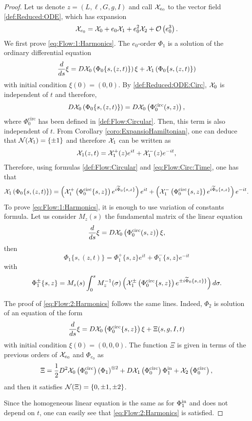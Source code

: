 \begin{proof}
Let us denote $z=(L,\ell,G,g,I)$ and call $\mathcal{X}_{e_0}$ to the vector field \eqref{def:Reduced:ODE}, which has expansion
\[
\mathcal{X}_{e_0}=\mathcal{X}_{0}+e_0\mathcal{X}_{1}+e_0^2\mathcal{X}_{2}+\mathcal{O}\left(e_0^3\right).
\]
We first prove \eqref{eq:Flow:1:Harmonics}.  The $e_0$-order $\Phi_1$ is a solution of the ordinary differential equation
  \[
  \frac{d}{ds} \xi=D\mathcal{X}_0\left(\Phi_0\{s,(z,t)\}\right)\xi+\mathcal{X}_1\left(\Phi_0\{s,(z,t)\}\right)
  \]
  with initial condition $\xi(0)=(0,0)$. By \eqref{def:Reduced:ODE:Circ}, $\mathcal{X}_0$ is independent of $t$ and therefore,
  \[
  D\mathcal{X}_0\left(\Phi_0\{s,(z,t)\}\right)=D\mathcal{X}_0\left(\Phi_0^\mathrm{circ}(s,z)\right),
  \]
 where $\Phi_0^\mathrm{circ}$ has been defined in \eqref{def:Flow:Circular}. Then, this term is also independent of $t$. From Corollary \ref{coro:ExpansioHamiltonian}, one can deduce that  $\mathcal{N}(\mathcal{X}_1)=\{\pm 1\}$ and therefore  $\mathcal{X}_1$ can be written as
  \[
  \mathcal{X}_1(z,t)=\mathcal{X}_1^+(z)e^{it}+\mathcal{X}_1^-(z)e^{-it},
  \]
  Therefore, using formulas \eqref{def:Flow:Circular} and \eqref{eq:Flow:Circ:Time}, one has that
  \[
  \mathcal{X}_1\left(\Phi_0\{s,(z,t)\}\right)=\left(\mathcal{X}_1^+\left(\Phi_0^\mathrm{circ}\{s,z\}\right)e^{i\widetilde\Phi_\text{0}\{s,z\}}\right)e^{it}+\left(\mathcal{X}_1^-\left(\Phi_0^\mathrm{circ}\{s,z\}\right)e^{i\widetilde\Phi_{0}\{s,z\}}\right)e^{-it}.
  \]
  To prove \eqref{eq:Flow:1:Harmonics}, it is enough to use variation of constants formula. Let us consider $M_{z}(s)$ the fundamental matrix of the linear equation
  \[
  \frac{d}{ds}\xi=D\mathcal{X}_0\left(\Phi_0^\mathrm{circ}(s,z)\right)\xi,
  \]
  then
  \[
  \Phi_1\{s,(z,t)\}=\Phi_1^{+}\{s,z\}e^{it}+\Phi_1^{-}\{s,z\}e^{-it}
  \]
  with
  \[
  \Phi_1^{\pm}\{s,z\}=M_{z}(s)\int_0^s M^{-1}_{z}(\sigma)\left(\mathcal{X}_1^\pm\left(\Phi_0^\mathrm{circ}\{s,z\}\right)e^{\pm i\widetilde\Phi_\text{0}\{s,z\}\}}\right)d\sigma.
  \]

  The proof of \eqref{eq:Flow:2:Harmonics} follows the same lines. Indeed, $\Phi_2$ is solution of an equation of the form
  \[
  \frac{d}{ds} \xi=D\mathcal{X}_0\left(\Phi_0^\mathrm{circ}\{s,z\}\right)\xi+\Xi(s,g,I,t)
  \]
  with initial condition $\xi(0)=(0,0,0)$. The function $\Xi$ is given in terms of the previous orders of $\mathcal{X}_{e_0}$ and $\Phi_{e_0}$ as
  \[
  \Xi=\frac{1}{2}D^2\mathcal{X}_0\left(\Phi_0^\mathrm{circ}\right)\left(\Phi_1\right)^{\otimes 2}+D\mathcal{X}_1\left(\Phi_0^\mathrm{circ}\right)\Phi_1^{\mathrm{in}}+\mathcal{X}_2\left(\Phi_0^\mathrm{circ}\right),
  \]
  and then it satisfies $\mathcal{N}(\Xi)=\{0,\pm 1, \pm 2\}$.

  Since the homogeneous linear equation is the same as for $\Phi_1^{\mathrm{in}}$ and does not depend on $t$, one can easily see that \eqref{eq:Flow:2:Harmonics} is satisfied.
\end{proof}

